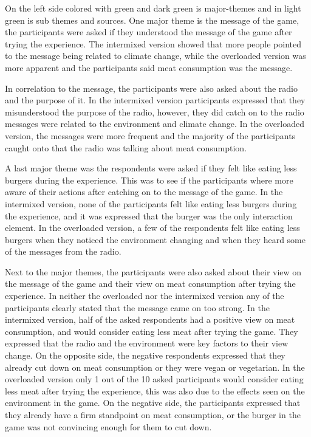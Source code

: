 On the left side colored with green and dark green is major-themes and in light green is sub themes and sources. One major theme is the message of the game, the participants were asked if they understood the message of the game after trying the experience. The intermixed version showed that more people pointed to the message being related to climate change, while the overloaded version was more apparent and the participants said meat consumption was the message. 

In correlation to the message, the participants were also asked about the radio and the purpose of it. In the intermixed version participants expressed that they misunderstood the purpose of the radio, however, they did catch on to the radio messages were related to the environment and climate change. In the overloaded version, the messages were more frequent and the majority of the participants caught onto that the radio was talking about meat consumption. 

A last major theme was the respondents were asked if they felt like eating less burgers during the experience. This was to see if the participants where more aware of their actions after catching on to the message of the game. In the intermixed version, none of the participants felt like eating less burgers during the experience, and it was expressed that the burger was the only interaction element. In the overloaded version, a few of the respondents felt like eating less burgers when they noticed the environment changing and when they heard some of the messages from the radio.

Next to the major themes, the participants were also asked about their view on the message of the game and their view on meat consumption after trying the experience. In neither the overloaded nor the intermixed version any of the participants clearly stated that the message came on too strong. In the intermixed version, half of the asked respondents had a positive view on meat consumption, and would consider eating less meat after trying the game. They expressed that the radio and the environment were key factors to their view change. On the opposite side, the negative respondents expressed that they already cut down on meat consumption or they were vegan or vegetarian. In the overloaded version only 1 out of the 10 asked participants would consider eating less meat after trying the experience, this was also due to the effects seen on the environment in the game. On the negative side, the participants expressed that they already have a firm standpoint on meat consumption, or the burger in the game was not convincing enough for them to cut down.

